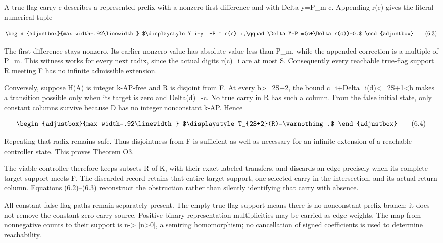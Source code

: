 A true-flag carry c describes a represented prefix with a nonzero first difference and with Delta y=P\_m c. Appending r(c) gives the literal numerical tuple

\[
\begin{adjustbox}{max width=.92\linewidth}
$\displaystyle Y_i=y_i+P_m r(c)_i,\qquad
\Delta Y=P_m(c+\Delta r(c))=0.$
\end{adjustbox}
\tag{6.3}
\]

The first difference stays nonzero. Its earlier nonzero value has absolute value less than P\_m, while the appended correction is a multiple of P\_m. This witness works for every next radix, since the actual digits r(c)\_i are at most S. Consequently every reachable true-flag support R meeting F has no infinite admissible extension.

Conversely, suppose H(A) is integer k-AP-free and R is disjoint from F. At every b\textgreater=2S+2, the bound \textbar c\_i+Delta\_i(d)\textbar\textless=2S+1\textless b makes a transition possible only when its target is zero and Delta(d)=-c. No true carry in R has such a column. From the false initial state, only constant columns survive because D has no integer nonconstant k-AP. Hence

\[
\begin{adjustbox}{max width=.92\linewidth}
$\displaystyle T_{2S+2}(R)=\varnothing.$
\end{adjustbox}
\tag{6.4}
\]

Repeating that radix remains safe. Thus disjointness from F is sufficient as well as necessary for an infinite extension of a reachable controller state. This proves Theorem O3.

The viable controller therefore keeps subsets R of K, with their exact labeled transfers, and discards an edge precisely when its complete target support meets F. The discarded record retains that entire target support, one selected carry in the intersection, and its actual return column. Equations (6.2)--(6.3) reconstruct the obstruction rather than silently identifying that carry with absence.

All constant false-flag paths remain separately present. The empty true-flag support means there is no nonconstant prefix branch; it does not remove the constant zero-carry source. Positive binary representation multiplicities may be carried as edge weights. The map from nonnegative counts to their support is n-\textgreater{} {[}n\textgreater0{]}, a semiring homomorphism; no cancellation of signed coefficients is used to determine reachability.

